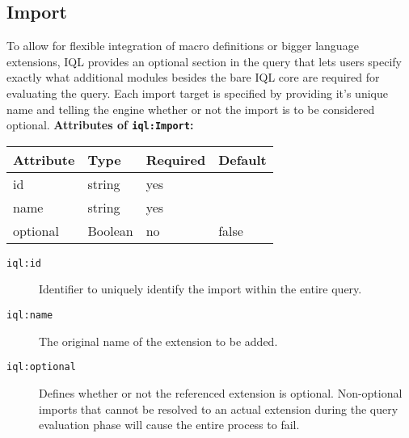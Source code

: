 \documentclass[11pt,a4paper,portrait]{article}
\newcommand{\iql}{IQL\xspace}
\newcommand{\iqlns}{iql:}
\newcommand{\iqlType}[1]{\texttt{\iqlns#1}}
\newcommand{\desc}[1]{\noindent#1\newline\medskip}
\newenvironment{attributes}[1]{
\noindent\textbf{Attributes of #1:}\newline\medskip
\begin{tabular}{|p{0.3\textwidth}|p{0.20\textwidth}|p{0.20\textwidth}|p{0.17\textwidth}|}
	\hline
	\textbf{Attribute} & \textbf{Type} & \textbf{Required} & \textbf{Default} \\ 
	\hline
	\hline
}{
\end{tabular}
}
\newcommand{\attribute}[4]{
	#1 & #2 & #3 & #4 \\
	\hline
}
\begin{document}
\subsection{Import}
\label{sec:json-ld-import}
\desc{To allow for flexible integration of macro definitions or bigger language extensions, \iql provides an optional section in the query that lets users specify exactly what additional modules besides the bare \iql core are required for evaluating the query. Each import target is specified by providing it's unique name and telling the engine whether or not the import is to be considered optional.}
\begin{attributes}{\iqlType{Import}}
	\attribute{id}{string}{yes}{}
	\attribute{name}{string}{yes}{}
	\attribute{optional}{Boolean}{no}{false}
\end{attributes}
\begin{description}
	\item[\iqlType{id}] Identifier to uniquely identify the import within the entire query.
	\item[\iqlType{name}] The original name of the extension to be added.
	\item[\iqlType{optional}] Defines whether or not the referenced extension is optional. 	Non-optional imports that cannot be resolved to an actual extension during the query evaluation phase will cause the entire process to fail.
\end{description}

\end{document}
